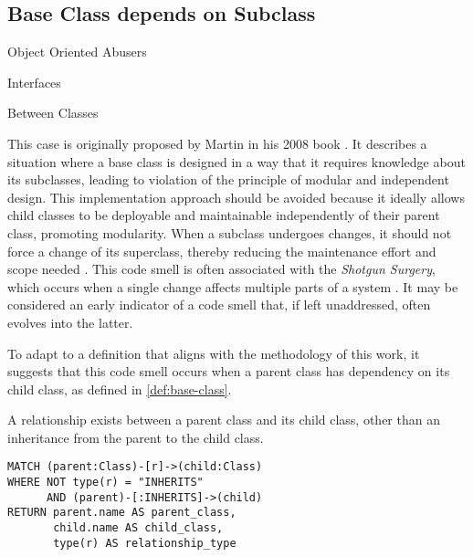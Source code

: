 \subsection{Base Class depends on Subclass}

\begin{description}[align=left, labelwidth=2.4cm]
  \item [Obstruction] Object Oriented Abusers
  \item [Occurence] Interfaces
  \item [Expanse] Between Classes
\end{description}

This case is originally proposed by Martin in his 2008 book \cite{Martin_2008}. It describes a situation where a base class is designed in a way that it requires knowledge about its subclasses, leading to violation of the principle of modular and independent design. This implementation approach should be avoided because it ideally allows child classes to be deployable and maintainable independently of their parent class, promoting modularity. When a subclass undergoes changes, it should not force a change of its superclass, thereby reducing the maintenance effort and scope needed \cite{Jerzyk_2023}. This code smell is often associated with the \textit{Shotgun Surgery}, which occurs when a single change affects multiple parts of a system \cite{Jerzyk_2023}. It may be considered an early indicator of a code smell that, if left unaddressed, often evolves into the latter.


To adapt to a definition that aligns with the methodology of this work, it suggests that this code smell occurs when a parent class has dependency on its child class, as defined in \autoref{def:base-class}.

\begin{definition}
A relationship exists between a parent class and its child class, other than an inheritance from the parent to the child class.
\label{def:base-class}
\end{definition}


\begin{verbatim}
MATCH (parent:Class)-[r]->(child:Class)
WHERE NOT type(r) = "INHERITS" 
      AND (parent)-[:INHERITS]->(child)
RETURN parent.name AS parent_class, 
       child.name AS child_class, 
       type(r) AS relationship_type
\end{verbatim}
